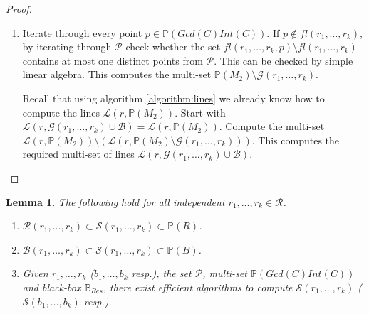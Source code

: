 \documentclass[12pt]{caltech_thesis}
\theoremstyle{plain}
\newtheorem{lemma}{Lemma}
\theoremstyle{definition}
\newcommand{\MS}{\mathcal{S}}
\newcommand{\MB}{\mathcal{B}}
\newcommand{\ML}{\mathcal{L}}
\newcommand{\MP}{\mathcal{P}}
\newcommand{\MR}{\mathcal{R}}
\newcommand{\MG}{\mathcal{G}}
\newcommand{\CB}{\mathbb{B}}
\newcommand{\PP}{\mathbb{P}}
\begin{document}
\begin{proof}
\begin{enumerate}
   \item Iterate through every point $p\in \PP(Gcd(C)Int(C))$. If $p\notin fl(r_1,\ldots,r_k)$, by iterating through $\MP$
   check whether the set $fl(r_1,\ldots,r_k,p)\setminus fl(r_1,\ldots,r_k)$ contains at most one distinct points from $\MP$. This can be
   checked by simple linear algebra. This computes the multi-set $\PP(M_2)\setminus \MG(r_1,\ldots,r_k) $.
   
   Recall that using algorithm \ref{algorithm:lines} we already know how to compute the lines $\ML(r,\PP(M_2))$.
   Start with $\ML(r,\MG(r_1,\ldots,r_k)\cup \MB) = \ML(r,\PP(M_2))$.
   Compute the multi-set $\ML(r,\PP(M_2)) \setminus (\ML(r, \PP(M_2)\setminus \MG(r_1,\ldots,r_k)))$.  This computes the
   required multi-set of lines $\ML(r,\MG(r_1,\ldots,r_k)\cup \MB)$.
   \end{enumerate}
 \end{proof}

 
 
 
  \begin{lemma}\label{lemma:goodsetproof}
  The following hold for all independent $r_1,\ldots,r_k \in \MR$.
  \begin{enumerate}
   \item $\MR(r_1,\ldots,r_k) \subset \MS(r_1,\ldots,r_k)\subset \PP(R)$.
   \item $\MB(r_1,\ldots,r_k) \subset \MS(r_1,\ldots,r_k)\subset \PP(B)$.
   \item Given $r_1,\ldots,r_k$ ($b_1,\ldots,b_k$ resp.), the set $\MP$, multi-set $\PP(Gcd(C)Int(C))$ and 
   black-box $\CB_{Res}$, there exist efficient algorithms to compute $\MS(r_1,\ldots,r_k)$ ($\MS(b_1,\ldots,b_k)$ resp.).
  \end{enumerate}

 \end{lemma}
 
\end{document}
